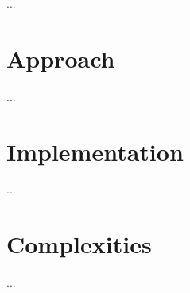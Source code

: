 
  
  ...
  
  \section{Approach}
    ...
  \section{Implementation}
    ...
  \section{Complexities}
    ...
